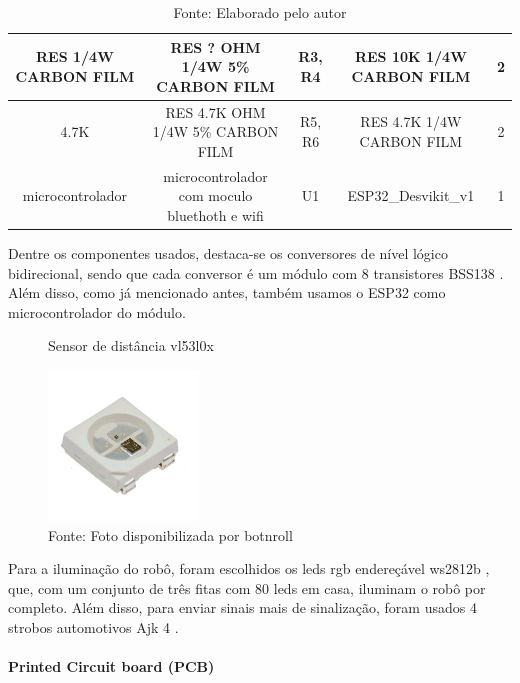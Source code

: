 \documentclass[../delivery_hospital_report.tex]{subfiles}
\begin{document}
\begin{table}[!h]
\begin{adjustbox}{width=\columnwidth,center}
\begin{tabular}{|c|c|c|c|c|}
RES 1/4W   CARBON FILM      & RES ? OHM 1/4W 5\%   CARBON FILM                               & R3, R4                   & RES 10K 1/4W CARBON   FILM  & 2        \\ \hline
4.7K                        & RES 4.7K OHM 1/4W 5\%   CARBON FILM                            & R5, R6                   & RES 4.7K 1/4W CARBON   FILM & 2        \\ \hline
microcontrolador            & microcontrolador com   moculo bluethoth e wifi                 & U1                       & ESP32\_Desvikit\_v1         & 1        \\ \hline

\end{tabular}
\end{adjustbox}
\centering
\caption*{Fonte: Elaborado pelo autor}
\label{table:Componentes Utilizados na placa de Sinalização - Protótipo}
\end{table}

Dentre os componentes usados, destaca-se os conversores de nível lógico bidirecional, sendo que cada conversor é um módulo com 8 transistores BSS138 \cite{BSS138_datasheet} . Além disso, como já mencionado antes, também usamos o ESP32 \cite{esp32} como microcontrolador do módulo.

\begin{figure}
\caption{ Sensor de distância vl53l0x}\label{wrap-fig:1}
\includegraphics[width=4cm]{modulos/led_rgb_end.png}
\caption*{Fonte: Foto disponibilizada por botnroll}\label{wrap-fig:1}
\end{figure} 

Para a iluminação do robô, foram escolhidos os leds rgb endereçável ws2812b \cite{WS2812B_datasheet}, que, com um conjunto de três fitas com 80 leds em casa, iluminam o robô por completo. Além disso, para enviar sinais mais de sinalização, foram usados 4 strobos automotivos Ajk 4 \cite{strobos_datasheet}.


\paragraph{Printed Circuit board (PCB)}
\end{document}
